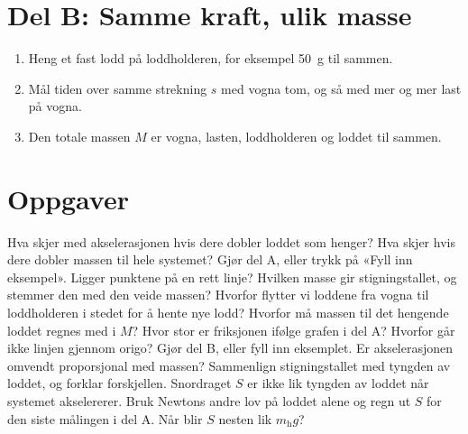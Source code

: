 \documentclass[11pt]{article}
\begin{document}
\section*{Del B: Samme kraft, ulik masse}

\begin{enumerate}
\item Heng et fast lodd på loddholderen, for eksempel 50~g til sammen.
\item Mål tiden over samme strekning $s$ med vogna tom, og så med mer og mer last på vogna.
\item Den totale massen $M$ er vogna, lasten, loddholderen og loddet til sammen.
\end{enumerate}

\section*{Oppgaver}

\begin{oppgaveliste}
\oppgave {}Hva skjer med akselerasjonen hvis dere dobler loddet som henger? Hva skjer hvis dere dobler massen til hele systemet?
\svar
\oppgave {}Gjør del A, eller trykk på «Fyll inn eksempel». Ligger punktene på en rett linje? Hvilken masse gir stigningstallet, og stemmer den med den veide massen?
\svar
\oppgave {}Hvorfor flytter vi loddene fra vogna til loddholderen i stedet for å hente nye lodd? Hvorfor må massen til det hengende loddet regnes med i $M$?
\svar
\oppgave {}Hvor stor er friksjonen ifølge grafen i del A? Hvorfor går ikke linjen gjennom origo?
\svar
\oppgave {}Gjør del B, eller fyll inn eksemplet. Er akselerasjonen omvendt proporsjonal med massen? Sammenlign stigningstallet med tyngden av loddet, og forklar forskjellen.
\svar
\oppgave {}Snordraget $S$ er ikke lik tyngden av loddet når systemet akselererer. Bruk Newtons andre lov på loddet alene og regn ut $S$ for den siste målingen i del A. Når blir $S$ nesten lik $m_{\mathrm{h}}g$?
\svar
\end{oppgaveliste}
\end{document}
